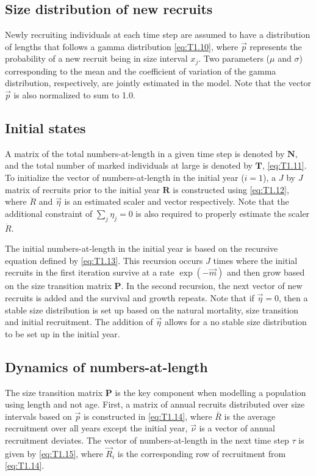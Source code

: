 
\subsection{Size distribution of new recruits} %
\label{sub:size_distribution_of_new_recruits}
Newly recruiting individuals at each time step are assumed to have a distribution of lengths that follows a gamma distribution \eqref{eq:T1.10}, where $\vec{p}$ represents the probability of a new recruit being in size interval $x_j$. Two parameters ($\mu$ and $\sigma$) corresponding to the mean and the coefficient of variation of the gamma distribution, respectively, are jointly estimated in the model.  Note that the vector $\vec{p}$ is also normalized to sum to 1.0.

\subsection{Initial states} %
\label{sub:initial_states}
A matrix of the total numbers-at-length in a given time step is denoted by $\mathbf{N}$, and the total number of marked individuals at large is denoted by $\mathbf{T}$, \eqref{eq:T1.11}.  To initialize the vector of numbers-at-length in the initial year ($i=1$), a $J$ by $J$ matrix of recruits prior to the initial year $\mathbf{R}$ is constructed using \eqref{eq:T1.12}, where $\ddot{R}$ and $\vec{\eta}$ is an estimated scaler and vector respectively.  Note that the additional constraint  of $\sum_j \eta_j = 0$ is also required to properly estimate the scaler $\ddot{R}$.

The initial numbers-at-length in the initial year is based on the recursive equation defined by \eqref{eq:T1.13}.  This recursion occurs $J$ times where the initial recruits in the first iteration survive at a rate $\exp(-\vec{m})$ and then grow based on the size transition matrix $\mathbf{P}$.  In the second recursion, the next vector of new recruits is added and the survival and growth repeats.  Note that if $\vec{\eta}=0$, then a stable size distribution is set up based on the natural mortality, size transition and initial recruitment.  The addition of $\vec{\eta}$ allows for a no stable size distribution to be set up in the initial year.

\subsection{Dynamics of numbers-at-length} %
\label{sub:dynamics_of_numbers_at_length}
The size transition matrix $\mathbf{P}$ is the key component when modelling a population using length and not age. First, a matrix of annual recruits distributed over size intervals based on $\vec{p}$ is constructed in \eqref{eq:T1.14}, where $\bar{R}$ is the average recruitment over all years except the initial year, $\vec{\nu}$ is a vector of annual recruitment deviates.  The  vector of numbers-at-length in the next time step $\tau$ is given by \eqref{eq:T1.15}, where $\vec{R}_i$ is the corresponding row of recruitment from \eqref{eq:T1.14}.


